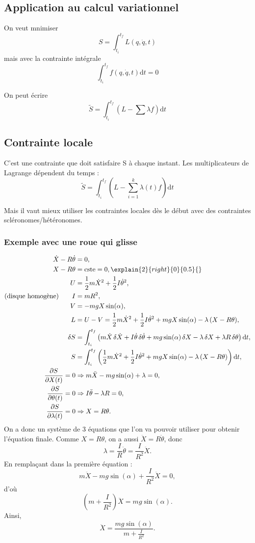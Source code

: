 \documentclass[french]{yLectureNote}
\newcommand{\dd}{\mathrm{d}}
\begin{document}
\subsection{Application au calcul variationnel}
On veut mnimiser $$S = \int_{t_i}^{t_f}L(q,\dot{q}, t)$$ mais avec la contrainte  intégrale $$\int_{t_i}^{t_f}f(q,\dot{q}, t)\dd t=0$$

On peut écrire
$$\tilde{S} =\int_{t_i}^{t_f} (L-\sum\lambda f) \dd t$$
\subsection{Contrainte locale}
C'est une contrainte que doit satisfaire S à chaque instant. Les multiplicateurs de Lagrange dépendent du temps :
$$\tilde{S} = \int_{t_i}^{t_f}(L-\sum_{i=1}^k \lambda(t)f)\dd t$$

Mais il vaut mieux utiliser les contraintes locales dès le début avec des contraintes scléronomes/hétéronomes.

\subsubsection{Exemple avec une roue qui glisse}
\begin{align*}
\dot{X} - R\dot{\theta} &= 0,\\
X - R\theta &= \text{cste} = 0,\explain{2}{right}{0}{0.5}{}\\
U &= \frac12 m\dot{X}^{2} + \frac12 I\dot{\theta}^{2},\\
\text{(disque homogène)} \qquad I &= mR^{2},\\
V &= -mgX\sin(\alpha),\\
L &= U - V
= \frac12 m\dot{X}^{2} + \frac12 I\dot{\theta}^{2} + mgX\sin(\alpha)
- \lambda\,(X - R\theta),\\
\delta S
&= \int_{t_i}^{t_f}\left(
m\dot{X}\,\delta\dot{X}
+ I\dot{\theta}\,\delta\dot{\theta}
+ mg\sin(\alpha)\,\delta X
- \lambda\,\delta X
+ \lambda R\,\delta\theta
\right)\dd t,\\
S
&= \int_{t_i}^{t_f}\left(
\frac12 m\dot{X}^{2}
+ \frac12 I\dot{\theta}^{2}
+ mgX\sin(\alpha)
- \lambda\,(X-R\theta)
\right)\dd t,\\
\frac{\partial S}{\partial X(t)} = 0
&\Rightarrow m\ddot{X} - mg\sin(\alpha) + \lambda = 0,\\
\frac{\partial S}{\partial \theta(t)} = 0
&\Rightarrow I\ddot{\theta} - \lambda R = 0,\\
\frac{\partial S}{\partial \lambda(t)} = 0
&\Rightarrow X = R\theta.
\end{align*}
On a donc un système de 3 équations que l'on va pouvoir utiliser pour obtenir l'équation finale.
Comme $X=R\theta$, on a aussi $\ddot{X}=R\ddot{\theta}$, donc
\[
\lambda = \frac{I}{R}\ddot{\theta}=\frac{I}{R^2}\ddot{X}.
\]
En remplaçant dans la première équation :
\[
m\ddot{X}-mg\sin(\alpha)+\frac{I}{R^2}\ddot{X}=0,
\]
d'où
\[
\left(m+\frac{I}{R^2}\right)\ddot{X}=mg\sin(\alpha).
\]
Ainsi,
\[
\ddot{X}=\frac{mg\sin(\alpha)}{m+\frac{I}{R^2}}.
\]
\end{document}
